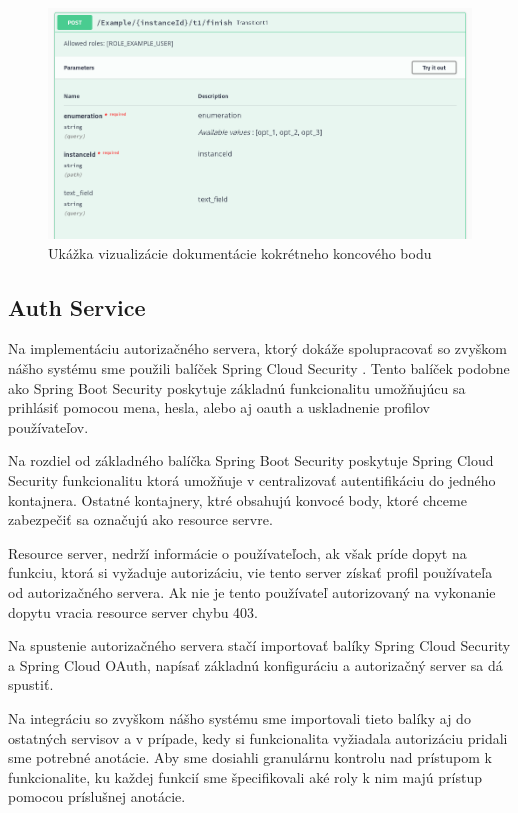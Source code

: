 \begin{figure}[!htbp] 
	\centering 
	\includegraphics[width=16cm]{img/swagger_ui_endpoint.png} 
	\caption{Ukážka vizualizácie dokumentácie kokrétneho koncového bodu} 
	\label{swagger_ui_endpoint} 
\end{figure}



\subsection{Auth Service}  \label{section_auth}

Na implementáciu autorizačného servera, ktorý dokáže spolupracovať so zvyškom nášho systému sme použili balíček Spring Cloud Security \cite{cloud_security}. Tento balíček podobne ako Spring Boot Security poskytuje základnú funkcionalitu umožňujúcu sa prihlásiť pomocou mena, hesla, alebo aj \acrshort{oauth} a uskladnenie profilov používateľov.  

Na rozdiel od základného balíčka Spring Boot Security poskytuje Spring Cloud Security funkcionalitu ktorá umožňuje v centralizovať autentifikáciu do jedného kontajnera. Ostatné kontajnery, ktré obsahujú konvocé body, ktoré chceme zabezpečiť sa označujú ako resource servre.

Resource server, nedrží informácie o používateľoch, ak však príde dopyt na funkciu, ktorá si vyžaduje autorizáciu, vie tento server získať profil používateľa od autorizačného servera. Ak nie je tento používateľ autorizovaný na vykonanie dopytu vracia resource server chybu 403. 

Na spustenie autorizačného servera stačí importovať balíky  Spring Cloud Security a Spring Cloud OAuth, napísať základnú konfiguráciu a autorizačný server sa dá spustiť.   

Na integráciu so zvyškom nášho systému sme importovali tieto balíky aj do ostatných servisov a v prípade, kedy si funkcionalita vyžiadala autorizáciu  pridali sme potrebné anotácie. Aby sme dosiahli granulárnu kontrolu nad prístupom k funkcionalite, ku každej funkcií sme špecifikovali aké roly k nim majú prístup pomocou príslušnej anotácie.  

